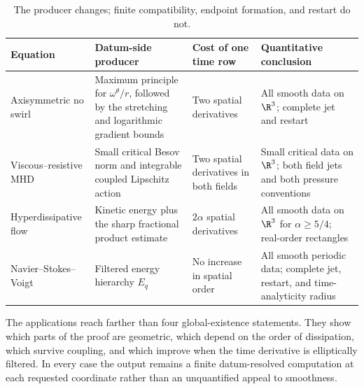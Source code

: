 \begin{table}[H]
\centering
\small
\begin{tabular}{@{}
>{\raggedright\arraybackslash}p{}
>{\raggedright\arraybackslash}p{}
>{\raggedright\arraybackslash}p{}
>{\raggedright\arraybackslash}p{}@{}}
\toprule
Equation & Datum-side producer & Cost of one time row & Quantitative conclusion \\
\midrule
Axisymmetric no swirl
& Maximum principle for \(\omega^\theta/r\), followed by the stretching and logarithmic gradient bounds
& Two spatial derivatives
& All smooth data on \(\R^3\); complete jet and restart \\
Viscous--resistive MHD
& Small critical Besov norm and integrable coupled Lipschitz action
& Two spatial derivatives in both fields
& Small critical data on \(\R^3\); both field jets and both pressure conventions \\
Hyperdissipative flow
& Kinetic energy plus the sharp fractional product estimate
& \(2\alpha\) spatial derivatives
& All smooth data on \(\R^3\) for \(\alpha\ge5/4\); real-order rectangles \\
Navier--Stokes--Voigt
& Filtered energy hierarchy \(E_q\)
& No increase in spatial order
& All smooth periodic data; complete jet, restart, and time-analyticity radius \\
\bottomrule
\end{tabular}
\caption{The producer changes; finite compatibility, endpoint formation, and restart do not.}
\label{tab:application-comparison}
\end{table}

The applications reach farther than four global-existence statements.  They
show which parts of the proof are geometric, which depend on the order of
dissipation, which survive coupling, and which improve when the time
derivative is elliptically filtered.  In every case the output remains a
finite datum-resolved computation at each requested coordinate rather than an
unquantified appeal to smoothness.
